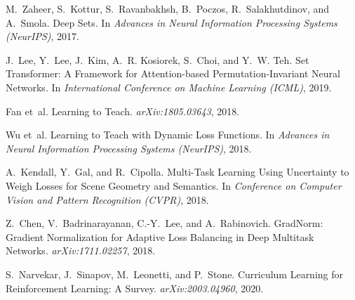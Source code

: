 \documentclass[11pt]{article}
\newcommand{\1}{\mathbf{1}}
\begin{document}
\begin{thebibliography}{30}
M.~Zaheer, S.~Kottur, S.~Ravanbakhsh, B.~Poczos, R.~Salakhutdinov, and A.~Smola.
\newblock Deep Sets.
\newblock In \emph{Advances in Neural Information Processing Systems (NeurIPS)}, 2017.

J.~Lee, Y.~Lee, J.~Kim, A.~R. Kosiorek, S.~Choi, and Y.~W. Teh.
\newblock Set Transformer: A Framework for Attention-based Permutation-Invariant Neural Networks.
\newblock In \emph{International Conference on Machine Learning (ICML)}, 2019.

Fan et~al.
\newblock Learning to Teach.
\newblock \emph{arXiv:1805.03643}, 2018.

Wu et~al.
\newblock Learning to Teach with Dynamic Loss Functions.
\newblock In \emph{Advances in Neural Information Processing Systems (NeurIPS)}, 2018.

A.~Kendall, Y.~Gal, and R.~Cipolla.
\newblock Multi-Task Learning Using Uncertainty to Weigh Losses for Scene Geometry and Semantics.
\newblock In \emph{Conference on Computer Vision and Pattern Recognition (CVPR)}, 2018.

Z.~Chen, V.~Badrinarayanan, C.-Y.~Lee, and A.~Rabinovich.
\newblock GradNorm: Gradient Normalization for Adaptive Loss Balancing in Deep Multitask Networks.
\newblock \emph{arXiv:1711.02257}, 2018.

S.~Narvekar, J.~Sinapov, M.~Leonetti, and P.~Stone.
\newblock Curriculum Learning for Reinforcement Learning: A Survey.
\newblock \emph{arXiv:2003.04960}, 2020.

\end{thebibliography}
\end{document}
